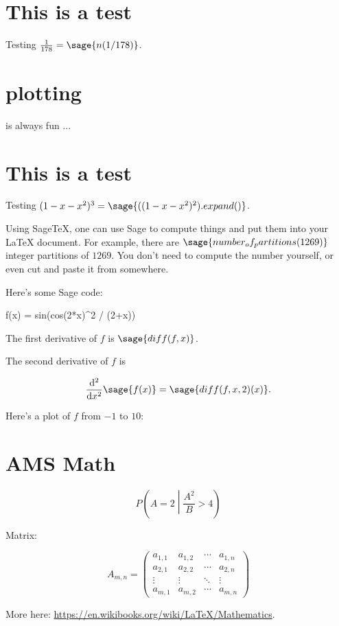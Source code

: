 \documentclass{article}
\begin{document}
\section{This is a test}

Testing $\frac{1}{178} = \sage{n(1/178)}$.

\section{plotting}

is always fun ...


\section{This is a test}

Testing $(1-x-x^2)^3 = \sage{((1-x-x^2)^2).expand()}$.

Using Sage\TeX, one can use Sage to compute things and put them into
your \LaTeX{} document. For example, there are
$\sage{number_of_partitions(1269)}$ integer partitions of $1269$.
You don't need to compute the number yourself, or even cut and paste
it from somewhere.

Here's some Sage code:

\begin{sageblock}
f(x) = sin(cos(2*x)^2 / (2+x))
\end{sageblock}

The first derivative of $f$ is $\sage{diff(f,x)}$.

The second derivative of $f$ is

\[
  \frac{\mathrm{d}^{2}}{\mathrm{d}x^{2}} \sage{f(x)} =
  \sage{diff(f, x, 2)(x)}.
\]

Here's a plot of $f$ from $-1$ to $10$:


\section{AMS Math}

$$P\left(A=2\middle|\frac{A^2}{B}>4\right)$$

Matrix:

\begin{equation*}
A_{m,n} =
 \begin{pmatrix}
  a_{1,1} & a_{1,2} & \cdots & a_{1,n} \\
  a_{2,1} & a_{2,2} & \cdots & a_{2,n} \\
  \vdots  & \vdots  & \ddots & \vdots  \\
  a_{m,1} & a_{m,2} & \cdots & a_{m,n}
 \end{pmatrix}
\end{equation*}

More here: \url{https://en.wikibooks.org/wiki/LaTeX/Mathematics}.
\end{document}
